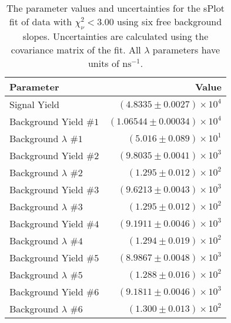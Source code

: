 
\begin{table}[ht]
    \begin{center}
        \begin{tabular}{lr}\toprule
            Parameter & Value \\\midrule
            Signal Yield & $(4.8335 \pm 0.0027) \times 10^{4}$ \\
            Background Yield $\#1$ & $(1.06544 \pm 0.00034) \times 10^{4}$ \\
            Background $\lambda$ $\#1$ & $(5.016 \pm 0.089) \times 10^{1}$ \\
            Background Yield $\#2$ & $(9.8035 \pm 0.0041) \times 10^{3}$ \\
            Background $\lambda$ $\#2$ & $(1.295 \pm 0.012) \times 10^{2}$ \\
            Background Yield $\#3$ & $(9.6213 \pm 0.0043) \times 10^{3}$ \\
            Background $\lambda$ $\#3$ & $(1.295 \pm 0.012) \times 10^{2}$ \\
            Background Yield $\#4$ & $(9.1911 \pm 0.0046) \times 10^{3}$ \\
            Background $\lambda$ $\#4$ & $(1.294 \pm 0.019) \times 10^{2}$ \\
            Background Yield $\#5$ & $(8.9867 \pm 0.0048) \times 10^{3}$ \\
            Background $\lambda$ $\#5$ & $(1.288 \pm 0.016) \times 10^{2}$ \\
            Background Yield $\#6$ & $(9.1811 \pm 0.0046) \times 10^{3}$ \\
            Background $\lambda$ $\#6$ & $(1.300 \pm 0.013) \times 10^{2}$ \\\bottomrule
        \end{tabular}
        \caption{The parameter values and uncertainties for the sPlot fit of data with $\chi^2_\nu < 3.00$ using six free background slopes. Uncertainties are calculated using the covariance matrix of the fit. All $\lambda$ parameters have units of $\si{\nano\second}^{-1}$.}\label{tab:splot-fit-results-chisqdof-3.00-free-6}
    \end{center}
\end{table}
